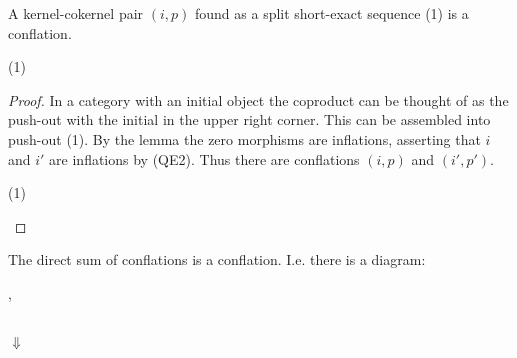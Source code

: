     \begin{corollary}
        A kernel-cokernel pair $(i,p)$ found as a split short-exact sequence (1) is a conflation. 
        
        \begin{center}
            (1)
        \end{center}
    \end{corollary}

    \begin{proof}
        In a category with an initial object the coproduct can be thought of as the push-out with the initial in the upper right corner. This can be assembled into push-out (1).
        By the lemma the zero morphisms are inflations, asserting that $i$ and $i'$ are inflations by (QE2). Thus there are conflations $(i,p)$ and $(i',p')$.

        \begin{center}
            (1)
        \end{center}
    \end{proof}

    \begin{corollary}
        The direct sum of conflations is a conflation. I.e. there is a diagram:
        \begin{center}
            , 
             \\
            $\Downarrow$ \\
        \end{center}
    \end{corollary}

